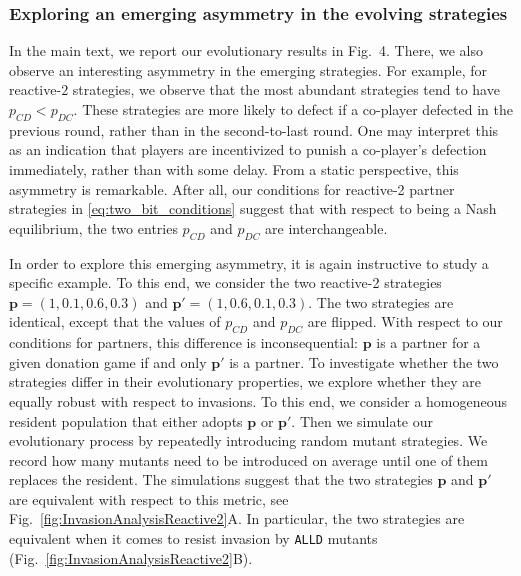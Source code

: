 \documentclass[9pt,twoside,lineno]{pnas-new}
\theoremstyle{plainCl1}
\theoremstyle{plainCl2}
\def\alld{\texttt{ALLD}}
\begin{document}

\subsubsection*{Exploring an emerging asymmetry in the evolving strategies}

In the main text, we report our evolutionary results in Fig.~4. 
There, we also observe an interesting asymmetry in the emerging strategies. 
For example, for reactive-$2$ strategies, we observe that the most abundant strategies tend to have $p_{CD}\!<\!p_{DC}$. 
These strategies are more likely to defect if a co-player defected in the previous round, rather than in the second-to-last round. 
One may interpret this as an indication that players are incentivized to punish a co-player's defection immediately, rather than with some delay. 
From a static perspective, this asymmetry is remarkable. 
After all, our conditions for reactive-2 partner strategies in \eqref{eq:two_bit_conditions} suggest that with respect to being a Nash equilibrium, the two entries $p_{CD}$ and $p_{DC}$ are interchangeable. 

In order to explore this emerging asymmetry, it is again instructive to study a specific example. 
To this end, we consider the two reactive-2 strategies $\mathbf{p}\!=\!(1,0.1,0.6,0.3)$ and $\mathbf{p'}\!=\!(1,0.6,0.1,0.3)$. 
The two strategies are identical, except that the values of $p_{CD}$ and $p_{DC}$ are flipped. 
With respect to our conditions for partners, this difference is inconsequential: $\mathbf{p}$ is a partner for a given donation game if and only $\mathbf{p'}$ is a partner. 
To investigate whether the two strategies differ in their evolutionary properties, we explore whether they are equally robust with respect to invasions. 
To this end, we consider a homogeneous resident population that either adopts $\mathbf{p}$ or $\mathbf{p'}$. 
Then we simulate our evolutionary process by repeatedly introducing random mutant strategies. 
We record how many mutants need to be introduced on average until one of them replaces the resident. 
The simulations suggest that the two strategies $\mathbf{p}$ and $\mathbf{p'}$ are equivalent with respect to this metric, see Fig.~\ref{fig:InvasionAnalysisReactive2}A. 
In particular, the two strategies are equivalent when it comes to resist invasion by \alld{} mutants (Fig.~\ref{fig:InvasionAnalysisReactive2}B). 
\end{document}
